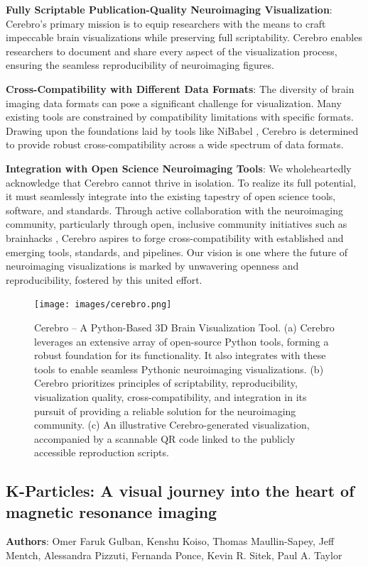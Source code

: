 \documentclass{article}
\begin{document}
\textbf{Fully Scriptable Publication-Quality Neuroimaging Visualization}:
Cerebro's primary mission is to equip researchers with the means to craft impeccable brain visualizations while preserving full scriptability. Cerebro enables researchers to document and share every aspect of the visualization process, ensuring the seamless reproducibility of neuroimaging figures.

\textbf{Cross-Compatibility with Different Data Formats}:
The diversity of brain imaging data formats can pose a significant challenge for visualization. Many existing tools are constrained by compatibility limitations with specific formats. Drawing upon the foundations laid by tools like NiBabel \cite{Brett2020-nx}, Cerebro is determined to provide robust cross-compatibility across a wide spectrum of data formats.

\textbf{Integration with Open Science Neuroimaging Tools}:
We wholeheartedly acknowledge that Cerebro cannot thrive in isolation. To realize its full potential, it must seamlessly integrate into the existing tapestry of open science tools, software, and standards. Through active collaboration with the neuroimaging community, particularly through open, inclusive community initiatives such as brainhacks \cite{gau2021brainhack}, Cerebro aspires to forge cross-compatibility with established and emerging tools, standards, and pipelines. Our vision is one where the future of neuroimaging visualizations is marked by unwavering openness and reproducibility, fostered by this united effort.

\begin{figure}[hbt!]
    \centering
    \texttt{[image: images/cerebro.png]}
    \label{fig:cerebro}
    \caption{
        Cerebro – A Python-Based 3D Brain Visualization Tool. (a) Cerebro leverages an extensive array of open-source Python tools, forming a robust foundation for its functionality. It also integrates with these tools to enable seamless Pythonic neuroimaging visualizations. (b) Cerebro prioritizes principles of scriptability, reproducibility, visualization quality, cross-compatibility, and integration in its pursuit of providing a reliable solution for the neuroimaging community. (c) An illustrative Cerebro-generated visualization, accompanied by a scannable QR code linked to the publicly accessible reproduction scripts.
    }
\end{figure}



\subsection{K-Particles: A visual journey into the heart of magnetic resonance imaging}
\textbf{Authors}: Omer Faruk Gulban, Kenshu Koiso, Thomas Maullin-Sapey, Jeff Mentch, Alessandra Pizzuti, Fernanda Ponce, Kevin R. Sitek, Paul A. Taylor
\end{document}

